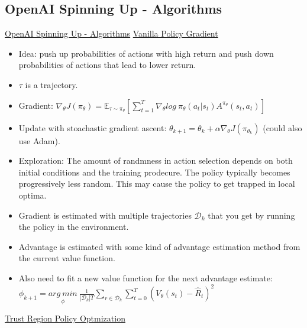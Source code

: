 \subsection{OpenAI Spinning Up - Algorithms}
\href{https://spinningup.openai.com/en/latest/index.html}{OpenAI Spinning Up - Algorithms}
\href{https://spinningup.openai.com/en/latest/algorithms/vpg.html}{Vanilla Policy Gradient}
\begin{itemize}[noitemsep,nolistsep]
	\item Idea: push up probabilities of actions with high return and push down probabilities of actions that lead to lower return.
	\item $\tau$ is a trajectory.
	\item Gradient: $\nabla_\theta J(\pi_\theta) = \mathbb{E}_{\tau \sim \pi_\theta} [\sum_{t=1}^T \nabla_\theta log\ \pi_\theta(a_t|s_t) A^{\pi_\theta}(s_t,a_t)]$
	\item Update with stoachastic gradient ascent: $\theta_{k+1} = \theta_k + \alpha \nabla_\theta J(\pi_{\theta_k})$ (could also use Adam).
	\item Exploration: The amount of randmness in action selection depends on both initial conditions and the training prodecure. The policy typically becomes progressively less random. This may cause the policy to get trapped in local optima.
	\item Gradient is estimated with multiple trajectories $\mathcal{D}_k$ that you get by running the policy in the environment.
	\item Advantage is estimated with some kind of advantage estimation method from the current value function.
	\item Also need to fit a new value function for the next advantage estimate: $\phi_{k+1} = \underset{\phi}{arg\ min}\ \frac{1}{|\mathcal{D}_k|T} \sum_{r \in \mathcal{D}_k} \sum_{t=0}^T (V_\theta (s_t) - \hat{R}_t)^2$
\end{itemize}
\href{https://spinningup.openai.com/en/latest/algorithms/trpo.html}{Trust Region Policy Optmization}
